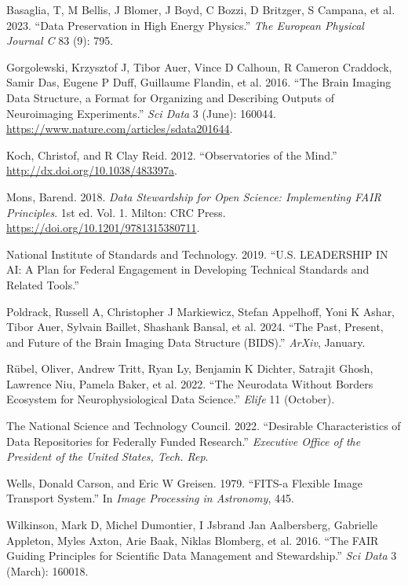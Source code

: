 \documentclass[
  letterpaper,
  DIV=11,
  numbers=noendperiod]{scrartcl}
\newlength{\cslhangindent}
\newenvironment{CSLReferences}[2] %
 {\begin{list}{}{%
  \setlength{\itemindent}{0pt}
  \setlength{\leftmargin}{0pt}
  \setlength{\parsep}{0pt}
  \ifodd #1
   \setlength{\leftmargin}{\cslhangindent}
   \setlength{\itemindent}{-1\cslhangindent}
  \fi
  \setlength{\itemsep}{#2\baselineskip}}}
 {\end{list}}
\begin{document}
\label{refs}
\begin{CSLReferences}{1}{0}
Basaglia, T, M Bellis, J Blomer, J Boyd, C Bozzi, D Britzger, S Campana,
et al. 2023. {``Data Preservation in High Energy Physics.''} \emph{The
European Physical Journal C} 83 (9): 795.

Gorgolewski, Krzysztof J, Tibor Auer, Vince D Calhoun, R Cameron
Craddock, Samir Das, Eugene P Duff, Guillaume Flandin, et al. 2016.
{``The {Brain} {Imaging} {Data} {Structure}, a Format for Organizing and
Describing Outputs of Neuroimaging Experiments.''} \emph{Sci Data} 3
(June): 160044. \url{https://www.nature.com/articles/sdata201644}.

Koch, Christof, and R Clay Reid. 2012. {``Observatories of the Mind.''}
\url{http://dx.doi.org/10.1038/483397a}.

Mons, Barend. 2018. \emph{Data Stewardship for Open Science:
Implementing FAIR Principles}. 1st ed. Vol. 1. Milton: CRC Press.
\url{https://doi.org/10.1201/9781315380711}.

National Institute of Standards and Technology. 2019. {``{U.S}.
{LEADERSHIP} {IN} {AI}: A Plan for Federal Engagement in Developing
Technical Standards and Related Tools.''}

Poldrack, Russell A, Christopher J Markiewicz, Stefan Appelhoff, Yoni K
Ashar, Tibor Auer, Sylvain Baillet, Shashank Bansal, et al. 2024. {``The
Past, Present, and Future of the Brain Imaging Data Structure
({BIDS}).''} \emph{ArXiv}, January.

Rübel, Oliver, Andrew Tritt, Ryan Ly, Benjamin K Dichter, Satrajit
Ghosh, Lawrence Niu, Pamela Baker, et al. 2022. {``The Neurodata Without
Borders Ecosystem for Neurophysiological Data Science.''} \emph{Elife}
11 (October).

The National Science and Technology Council. 2022. {``Desirable
Characteristics of Data Repositories for Federally Funded Research.''}
\emph{Executive Office of the President of the United States, Tech.
Rep}.

Wells, Donald Carson, and Eric W Greisen. 1979. {``FITS-a Flexible Image
Transport System.''} In \emph{Image Processing in Astronomy}, 445.

Wilkinson, Mark D, Michel Dumontier, I Jsbrand Jan Aalbersberg,
Gabrielle Appleton, Myles Axton, Arie Baak, Niklas Blomberg, et al.
2016. {``The {FAIR} Guiding Principles for Scientific Data Management
and Stewardship.''} \emph{Sci Data} 3 (March): 160018.

\end{CSLReferences}
\end{document}
